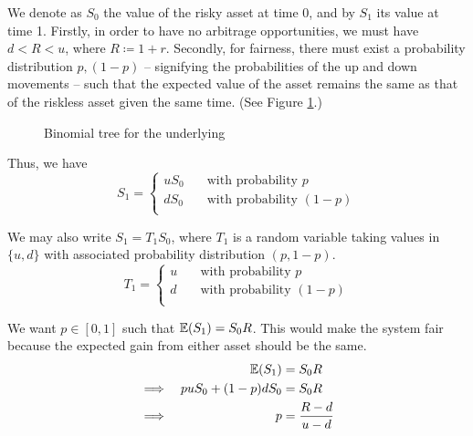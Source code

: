 We denote as $ S_0 $ the value of the risky asset at time 0, and by $ S_1 $ its value at time 1. Firstly, in order to have no arbitrage opportunities, we must have $ d < R < u $, where $ R \coloneqq 1 + r $. Secondly, for fairness, there must exist a probability distribution $ p, (1-p) $ -- signifying the probabilities of the up and down movements -- such that the expected value of the asset remains the same as that of the riskless asset given the same time. (See Figure \ref{fig:discrete-2tr-underlying}.)


\begin{figure}
	
	\caption{Binomial tree for the underlying}
	\label{fig:discrete-2tr-underlying}
\end{figure}


Thus, we have
\begin{equation*}
	S_1 =
	\begin{cases}
		u S_0 & \quad \text{with probability } p \\
		d S_0 & \quad \text{with probability } (1 - p) \\		
	\end{cases}
\end{equation*}

We may also write $ S_1 = T_1 S_0 $, where $ T_1 $ is a random variable taking values in $ \{ u, d \} $ with associated probability distribution $ (p, 1-p) $.
\begin{equation*}
	T_1 =
	\begin{cases}
		u  & \quad \text{with probability } p \\
		d  & \quad \text{with probability } (1 - p) \\		
	\end{cases}
\end{equation*}


We want $ p \in [0,1] $ such that $ \operatorname{\mathbb{E}}(S_1) = S_0 R $. This would make the system fair because the expected gain from either asset should be the same.
\begin{alignat}{9}
	          &&  \operatorname{\mathbb{E}}(S_1) &= S_0 R \\
	\implies  &&   p u S_0 + ( 1 - p ) d S_0  & =  S_0 R \nonumber \\
	\implies  &&  p  & =  \frac{R - d}{u - d}    \label{eq:discrete-pr}
\end{alignat}

